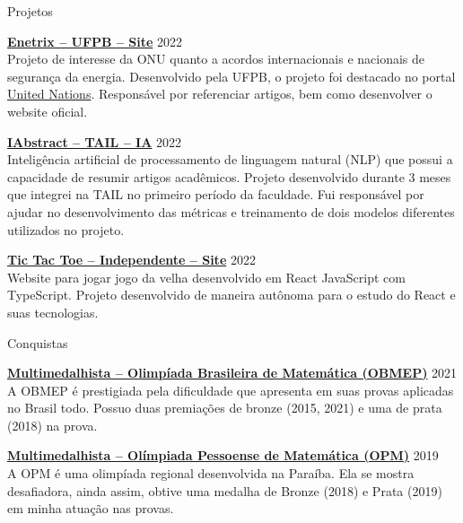 \documentclass{resume} %
\begin{document}
\begin{rSection}{Projetos}

\item \textbf{\href{https://enetrix.ufpb.br/}{Enetrix – UFPB – Site}} \hfill 2022 \\
Projeto de interesse da ONU quanto a acordos internacionais e nacionais de segurança da energia. Desenvolvido pela UFPB, o projeto foi destacado no portal \href{https://www.un.org/en/academic-impact/insights-energy-diplomacy-and-un-data-intensive-research-brazilian-universities}{United Nations}. Responsável por referenciar artigos, bem como desenvolver o website oficial.

\item \textbf{\href{https://github.com/ralfferreira/generate-abstract}{IAbstract – TAIL – IA}} \hfill 2022 \\
Inteligência artificial de processamento de linguagem natural (NLP) que possui a capacidade de resumir artigos acadêmicos. Projeto desenvolvido durante 3 meses que integrei na TAIL no primeiro período da faculdade. Fui responsável por ajudar no desenvolvimento das métricas e treinamento de dois modelos diferentes utilizados no projeto. 

\item \textbf{\href{https://georgepaulino.github.io/TicTacToe/}{Tic Tac Toe – Independente – Site}}  \hfill 2022 \\
Website para jogar jogo da velha desenvolvido em React JavaScript com TypeScript. Projeto desenvolvido de maneira autônoma para o estudo do React e suas tecnologias.

\end{rSection} 


\begin{rSection}{Conquistas}

\item \textbf{\href{http://www.obmep.org.br/}{Multimedalhista – Olimpíada Brasileira de Matemática (OBMEP)}} \hfill 2021 \\
A OBMEP é prestigiada pela dificuldade que apresenta em suas provas aplicadas no Brasil todo. Possuo duas premiações de bronze (2015, 2021) e uma de prata (2018) na prova.

\item \textbf{\href{http://www.mat.ufpb.br/opm/}{Multimedalhista – Olímpiada Pessoense de Matemática (OPM)}} \hfill 2019 \\
A OPM é uma olimpíada regional desenvolvida na Paraíba. Ela se mostra desafiadora, ainda assim, obtive uma medalha de Bronze (2018) e Prata (2019) em minha atuação nas provas.

\end{rSection}
\end{document}
